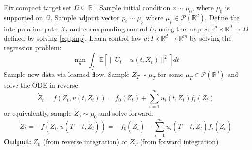 \documentclass{article}
\DeclareMathOperator*{\argmax}{arg\,max}
\newtheorem{assumption}[theorem]{Assumption}
\newcommand{\Rd}{\mathbb{R}^d}
\newcommand{\R}{\mathbb{R}}
\begin{document}
\begin{algorithm}
\caption{Flow Matching Along Pontryagin System through Time Reversal (Fixed-end Point Problems)}
\label{alg:pmp-flow}
\begin{algorithmic}[1]
\State Fix compact target set $\Omega \subseteq \Rd$. Sample initial condition $x  \sim \mu_0$, where $\mu_0$ is supported on $\Omega$. 
\State Sample adjoint vector $p_0 \sim \mu_p$ where $\mu_p \in \mathcal{P}(\mathbb{R}^d)$.
\State Define the interpolation path $X_t$ and corresponding control $U_t$ using the map $S: \mathbb{R}^d \times \Rd \rightarrow \Omega$ defined by solving \eqref{eq:pmp}.
\State Learn control law $u: I \times \mathbb{R}^d \rightarrow \mathbb{R}^m$ by solving the regression problem:
\[\min_{u} \int_I \mathbb{E}\left[\|U_t - u(t, X_t)\|^2\right] dt\]
\State Sample new data via learned flow. Sample $Z_T \sim \mu_T$ for some $\mu_T \in \mathcal{P}(\mathbb{R}^d)$ and solve the ODE in reverse:
\[\dot{Z}_t = f(Z_t, u(t, Z_t)) = f_0(Z_t) + \sum_{i=1}^m u_i(t, Z_t) f_i(Z_t)\]
or equivalently, sample $\tilde{Z}_0 \sim \mu_0$ and solve forward:
\[\dot{\tilde{Z}}_t = -f(\tilde{Z}_t, u(T-t, \tilde{Z}_t)) = -f_0(\tilde{Z}_t) - \sum_{i=1}^m u_i(T-t, \tilde{Z}_t) f_i(\tilde{Z}_t)\]
\State \textbf{Output:} $Z_0$ (from reverse integration) or $\tilde{Z}_T$ (from forward integration)
\end{algorithmic}
\end{algorithm}









\end{document}
